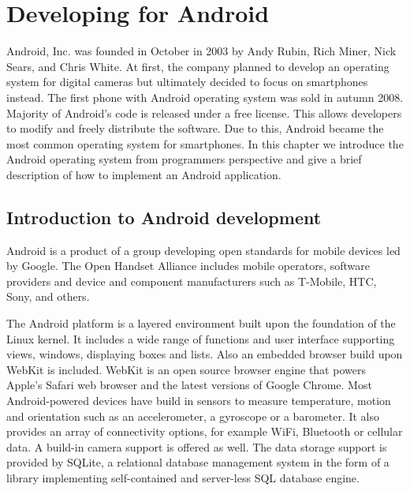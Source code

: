 
\chapter{Developing for Android}
\label{chap:android}

Android, Inc\@. was founded in October in 2003 by Andy Rubin, Rich Miner, Nick Sears, and Chris White. 
At first, the company planned to develop an operating system for digital cameras %
but ultimately %
decided to focus on smartphones instead. %
The first phone with Android operating system was sold in autumn 2008.
Majority of Android's code is released under a free license. 
This allows developers to modify and freely distribute the software.
Due to this, Android became the most common operating system for smartphones.
In this chapter we introduce the Android operating system from programmers perspective and give a brief description of how to implement an Android application.

\section{Introduction to Android development}

Android is a product of a group developing open standards for mobile devices led by Google.
The Open Handset Alliance includes mobile operators, software providers and device and component manufacturers such as
T-Mobile, HTC, Sony, and others.

The Android platform is a layered environment built upon the foundation of the Linux kernel.
It includes a wide range of functions and user interface supporting views, windows, displaying boxes and lists.
Also an embedded browser build upon WebKit is included.
WebKit is an open source browser engine that powers Apple's Safari web browser and the latest versions of Google Chrome.
Most Android-powered devices have build in sensors to measure temperature, motion and orientation 
such as an accelerometer, a gyroscope or a barometer.
It also provides an array of connectivity options, for example WiFi, Bluetooth or cellular data.
A build-in camera support is offered as well.
The data storage support is provided by SQLite, a relational database management system in the form of a library implementing self-contained and server-less SQL database engine.
 
